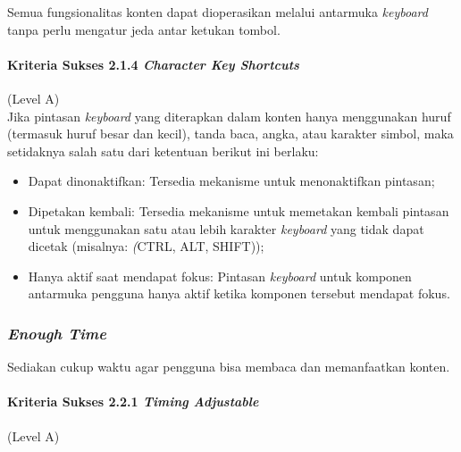 \documentclass[a4paper,twoside]{article}
\begin{document}
\begin{enumerate}
		Semua fungsionalitas konten dapat dioperasikan melalui antarmuka \textit{keyboard} tanpa perlu mengatur jeda antar ketukan tombol.

		\paragraph{Kriteria Sukses 2.1.4 \textit{Character Key Shortcuts}}
		\label{sec:kriteria_sukses_2.1.4}
		(Level A)\\

		Jika pintasan \textit{keyboard} yang diterapkan dalam konten hanya menggunakan huruf (termasuk huruf besar dan kecil), tanda baca, angka, atau karakter simbol, maka setidaknya salah satu dari ketentuan berikut ini berlaku:
		\begin{itemize}
			\item Dapat dinonaktifkan: Tersedia mekanisme untuk menonaktifkan pintasan;
			\item Dipetakan kembali: Tersedia mekanisme untuk memetakan kembali pintasan untuk menggunakan satu atau lebih karakter \textit{keyboard} yang tidak dapat dicetak (misalnya: \textit(CTRL, ALT, SHIFT));
			\item Hanya aktif saat mendapat fokus: Pintasan \textit{keyboard} untuk komponen antarmuka pengguna hanya aktif ketika komponen tersebut mendapat fokus.
		\end{itemize}

		\subsubsection*{\textit{Enough Time}}
		\label{sec:enough_time}
		Sediakan cukup waktu agar pengguna bisa membaca dan memanfaatkan konten.

		\paragraph{Kriteria Sukses 2.2.1 \textit{Timing Adjustable}}
		\label{sec:kriteria_sukses_2.2.1}
		(Level A)\\


\end{enumerate}
\end{document}
